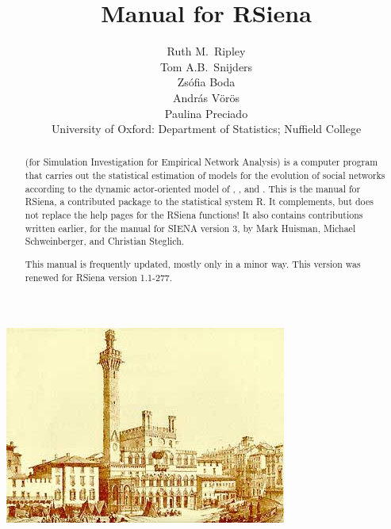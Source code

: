\documentclass[a4paper,fleqn,11pt]{article}
\title{{\Huge Manual for \textsf{RSiena} } }
\author{\Large Ruth M.\ Ripley\\[1ex]
        \Large Tom A.B.\ Snijders\\[1ex]
        \Large Zs\'{o}fia Boda\\[1ex]
        \Large Andr\'{a}s V\"{o}r\"{o}s\\[1ex]
        \Large Paulina Preciado  \\[4ex]
       {\large University of Oxford: Department of Statistics; Nuffield College}\\[1ex]
    }
\newcommand{\+}{\, + \,}
\newcommand{\Rn}{{\sf R}}
\newcommand{\rs}{{\sf RSiena}}
\newcommand{\RS}{{\sf RSiena }}
\newcommand{\SI}{{\sf SIENA }}
\begin{document}

\maketitle

\vfill
\begin{center}
\includegraphics*[scale=3]{ilcampo.jpg}
\end{center}
\vfill

\begin{abstract}
\noindent \SI (for {\sf Simulation Investigation for Empirical
Network Analysis}) is a computer program that carries out the
statistical estimation of models for the evolution of social
networks according to the dynamic actor-oriented model of \citet{Snijders01,
Snijders05}, \citet*{SnijdersEA07}, and \citet*{SnijdersEA10a}.
This is the manual for \rs,
a contributed package to the statistical system \Rn.
It complements, but does not replace the help pages
for the \RS functions!
It also contains contributions written earlier, for the manual for \SI version 3,
by Mark Huisman, Michael Schweinberger, and Christian Steglich.

This manual is frequently updated, mostly only in a minor way.
This version was renewed for \RS version 1.1-277.
\end{abstract}




\vfill
\newpage
\tableofcontents
\newpage

\makeatletter
\def\@linkcolor{lc}
\makeatother
\end{document}
